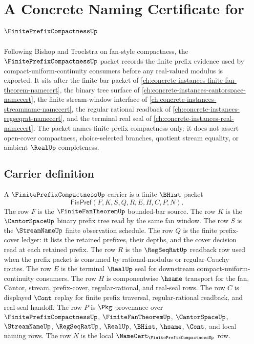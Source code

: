 \chapter{A Concrete Naming Certificate for $\FinitePrefixCompactnessUp$}
\label{ch:concrete-instances-finite-prefix-compactness-namecert}

Following Bishop and Troelstra on fan-style compactness, the $\FinitePrefixCompactnessUp$ packet records the finite prefix evidence used by compact-uniform-continuity consumers before any real-valued modulus is exported. It sits after the finite bar packet of \autoref{ch:concrete-instances-finite-fan-theorem-namecert}, the binary tree surface of \autoref{ch:concrete-instances-cantorspace-namecert}, the finite stream-window interface of \autoref{ch:concrete-instances-streamname-namecert}, the regular rational readback of \autoref{ch:concrete-instances-regseqrat-namecert}, and the terminal real seal of \autoref{ch:concrete-instances-real-namecert}. The packet names finite prefix compactness only; it does not assert open-cover compactness, choice-selected branches, quotient stream equality, or ambient $\RealUp$ completeness.

\section{Carrier definition}
\label{sec:finite-prefix-compactness-carrier}

\begin{definition}\label{def:finite-prefix-compactness-carrier}
A $\FinitePrefixCompactnessUp$ carrier is a finite $\BHist$ packet
$$
\mathsf{FinPref}(F,K,S,Q,R,E,H,C,P,N).
$$
The row $F$ is the $\FiniteFanTheoremUp$ bounded-bar source. The row $K$ is the $\CantorSpaceUp$ binary prefix tree read by the same fan window. The row $S$ is the $\StreamNameUp$ finite observation schedule. The row $Q$ is the finite prefix-cover ledger: it lists the retained prefixes, their depths, and the cover decision read at each retained prefix. The row $R$ is the $\RegSeqRatUp$ readback row used when the prefix packet is consumed by rational-modulus or regular-Cauchy routes. The row $E$ is the terminal $\RealUp$ seal for downstream compact-uniform-continuity consumers. The row $H$ is componentwise $\hsame$ transport for the fan, Cantor, stream, prefix-cover, regular-rational, and real-seal rows. The row $C$ is displayed $\Cont$ replay for finite prefix traversal, regular-rational readback, and real-seal handoff. The row $P$ is $\Pkg$ provenance over $\FinitePrefixCompactnessUp$, $\FiniteFanTheoremUp$, $\CantorSpaceUp$, $\StreamNameUp$, $\RegSeqRatUp$, $\RealUp$, $\BHist$, $\hsame$, $\Cont$, and local naming rows. The row $N$ is the local $\NameCert_{\FinitePrefixCompactnessUp}$ row.
\end{definition}

